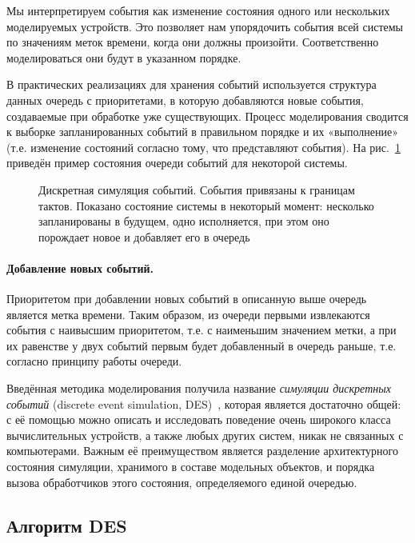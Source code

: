 Мы интерпретируем события как изменение состояния одного или нескольких моделируемых устройств. Это позволяет нам упорядочить события всей системы по значениям меток времени, когда они должны произойти. Соответственно моделироваться они будут в указанном порядке. 

В практических реализациях для хранения событий используется структура данных очередь с приоритетами, в которую добавляются новые события, создаваемые при обработке уже существующих. Процесс моделирования сводится к выборке запланированных событий в правильном порядке и их «выполнение» (т.е. изменение состояний согласно тому, что представляют события). На рис.~\ref{fig:queue1} приведён пример состояния очереди событий для некоторой системы.  

\begin{figure}[htp]
    \centering
    \caption[Дискретная симуляция событий]{Дискретная симуляция событий. События привязаны к границам тактов. Показано состояние системы в некоторый момент: несколько запланированы в будущем, одно исполняется, при этом оно порождает новое и добавляет его в очередь}
    \label{fig:queue1}
\end{figure}

\paragraph{Добавление новых событий.} Приоритетом при добавлении новых событий в описанную выше очередь является метка времени. Таким образом, из очереди первыми извлекаются события с наивысшим приоритетом, т.е. с наименьшим значением метки, а при их равенстве у двух событий первым будет добавленный в очередь раньше, т.е. согласно принципу работы очереди.

Введённая методика моделирования получила название \textit{симуляции дискретных событий} (\abbr discrete event simulation, DES)~\cite{fujimoto-parallel-dist-sim, introduction-to-des, Cain02preciseand}, которая является достаточно общей: с её помощью можно описать и исследовать поведение очень широкого класса вычислительных устройств, а также любых других систем, никак не связанных с компьютерами. Важным её преимуществом является разделение архитектурного состояния симуляции, хранимого в составе модельных объектов, и порядка вызова обработчиков этого состояния, определяемого единой очередью.

\subsection{Алгоритм DES}

